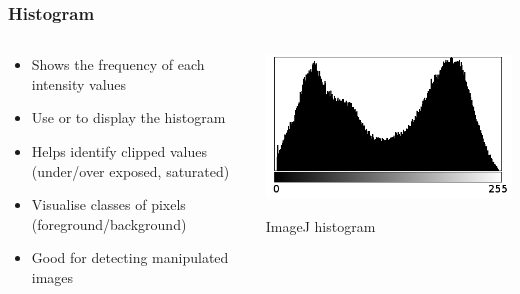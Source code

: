\documentclass[ignorenonframetext,aspectratio=169,10pt,xcolor=table]{beamer}
\begin{document}
\begin{frame} \frametitle{Histogram}

  \begin{columns}

    \begin{column}{0.5\textwidth}
      \begin{itemize}\setlength\itemsep{1em}
      \item Shows the frequency of each intensity values
      \item Use  or  to display the
        histogram
      \item Helps identify clipped values (under/over exposed, saturated)
      \item Visualise classes of pixels (foreground/background)
      \item Good for detecting manipulated images
      \end{itemize}
    \end{column}

    \begin{column}{0.5\textwidth}
      \begin{center}
        \includegraphics[width=\textwidth]{histogram}

        {\tiny ImageJ histogram}
      \end{center}
    \end{column}

  \end{columns}

\end{frame}
\end{document}
